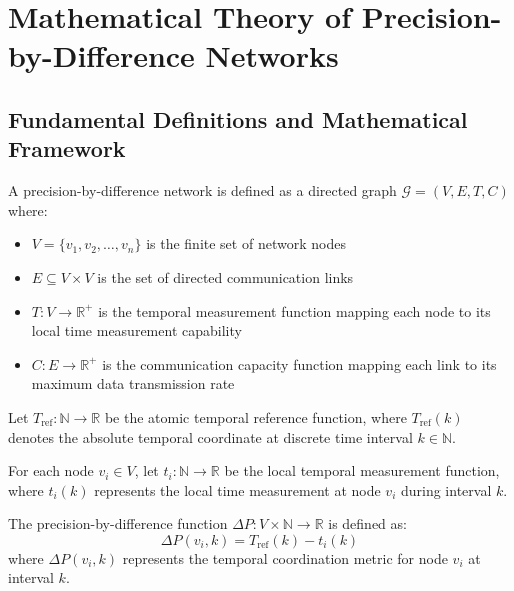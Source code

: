 \section{Mathematical Theory of Precision-by-Difference Networks}

\subsection{Fundamental Definitions and Mathematical Framework}

\begin{definition}
A precision-by-difference network is defined as a directed graph $\mathcal{G} = (V, E, T, C)$ where:
\begin{itemize}
\item $V = \{v_1, v_2, \ldots, v_n\}$ is the finite set of network nodes
\item $E \subseteq V \times V$ is the set of directed communication links
\item $T: V \to \mathbb{R}^+$ is the temporal measurement function mapping each node to its local time measurement capability
\item $C: E \to \mathbb{R}^+$ is the communication capacity function mapping each link to its maximum data transmission rate
\end{itemize}
\end{definition}

\begin{definition}
Let $T_{\text{ref}}: \mathbb{N} \to \mathbb{R}$ be the atomic temporal reference function, where $T_{\text{ref}}(k)$ denotes the absolute temporal coordinate at discrete time interval $k \in \mathbb{N}$.
\end{definition}

\begin{definition}
For each node $v_i \in V$, let $t_i: \mathbb{N} \to \mathbb{R}$ be the local temporal measurement function, where $t_i(k)$ represents the local time measurement at node $v_i$ during interval $k$.
\end{definition}

\begin{definition}
The precision-by-difference function $\Delta P: V \times \mathbb{N} \to \mathbb{R}$ is defined as:
\begin{equation}
\Delta P(v_i, k) = T_{\text{ref}}(k) - t_i(k)
\label{eq:precision_diff_formal}
\end{equation}
where $\Delta P(v_i, k)$ represents the temporal coordination metric for node $v_i$ at interval $k$.
\end{definition}


